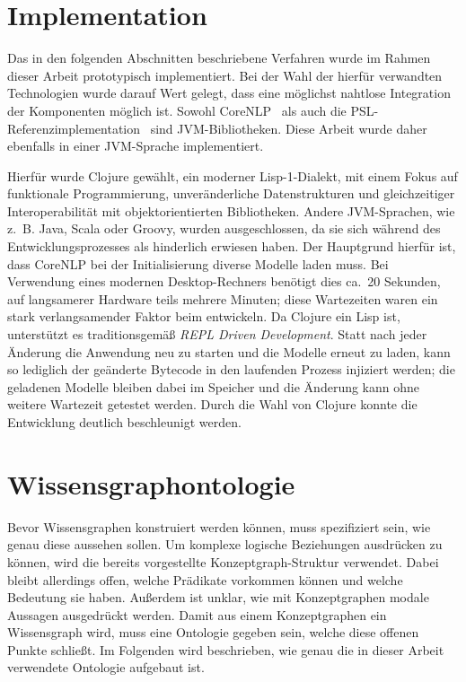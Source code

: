 \section{Implementation}%
\label{sec:text2kg:implementation}

Das in den folgenden Abschnitten beschriebene Verfahren wurde im Rahmen dieser Arbeit prototypisch implementiert.
Bei der Wahl der hierfür verwandten Technologien wurde darauf Wert gelegt, dass eine möglichst nahtlose Integration der Komponenten möglich ist.
Sowohl CoreNLP~\cite{CoreNLP} als auch die PSL-Referenzimplementation~\cite{PSL} sind JVM-Bibliotheken.
Diese Arbeit wurde daher ebenfalls in einer JVM-Sprache implementiert.

Hierfür wurde Clojure gewählt, ein moderner Lisp-1-Dialekt, mit einem Fokus auf funktionale Programmierung, unveränderliche Datenstrukturen und gleichzeitiger Interoperabilität mit objektorientierten Bibliotheken.
Andere JVM-Sprachen, wie z.~B. Java, Scala oder Groovy, wurden ausgeschlossen, da sie sich während des Entwicklungsprozesses als hinderlich erwiesen haben.
Der Hauptgrund hierfür ist, dass CoreNLP bei der Initialisierung diverse Modelle laden muss.
Bei Verwendung eines modernen Desktop-Rechners benötigt dies ca.~20 Sekunden, auf langsamerer Hardware teils mehrere Minuten;
diese Wartezeiten waren ein stark verlangsamender Faktor beim entwickeln.
Da Clojure ein Lisp ist, unterstützt es traditionsgemäß \textit{REPL Driven Development}.
Statt nach jeder Änderung die Anwendung neu zu starten und die Modelle erneut zu laden, kann so lediglich der geänderte Bytecode in den laufenden Prozess injiziert werden;
die geladenen Modelle bleiben dabei im Speicher und die Änderung kann ohne weitere Wartezeit getestet werden.
Durch die Wahl von Clojure konnte die Entwicklung deutlich beschleunigt werden.

\section{Wissensgraphontologie}%
\label{sec:text2kg:ontology}

Bevor Wissensgraphen konstruiert werden können, muss spezifiziert sein, wie genau diese aussehen sollen.
Um komplexe logische Beziehungen ausdrücken zu können, wird die bereits vorgestellte Konzeptgraph-Struktur verwendet.
Dabei bleibt allerdings offen, welche Prädikate vorkommen können und welche Bedeutung sie haben.
Außerdem ist unklar, wie mit Konzeptgraphen modale Aussagen ausgedrückt werden.
Damit aus einem Konzeptgraphen ein Wissensgraph wird, muss eine Ontologie gegeben sein, welche diese offenen Punkte schließt.
Im Folgenden wird beschrieben, wie genau die in dieser Arbeit verwendete Ontologie aufgebaut ist.

